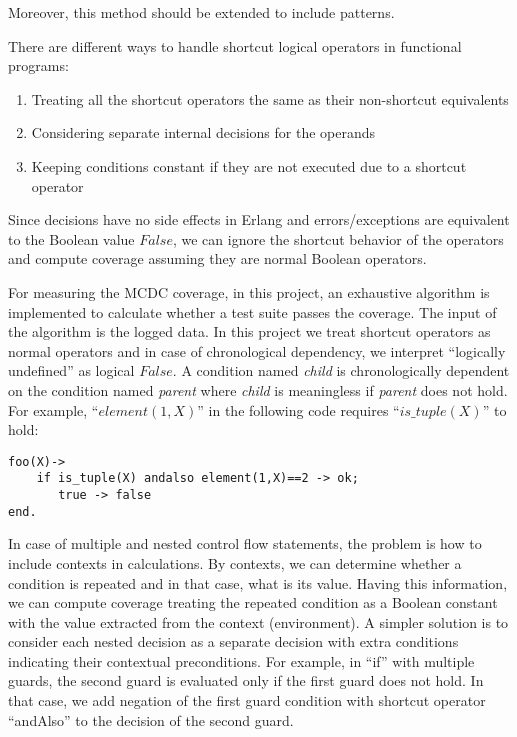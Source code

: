 \documentclass[12pt,a4paper]{report}
\begin{document}
Moreover, this method should be extended to include patterns.

There are different ways to handle shortcut logical operators in functional programs:

\begin{enumerate}
 \item Treating all the shortcut operators the same as their non-shortcut equivalents
 \item Considering separate internal decisions for the operands\cite{DO-248B} 
 \item Keeping conditions constant if they are not executed due to a shortcut operator\cite{chilenski1994applicability}
\end{enumerate}
 
Since decisions have no side effects in Erlang and errors/exceptions are equivalent to the Boolean value $False$, we can ignore the shortcut behavior of the operators and compute coverage assuming they are normal Boolean operators.  
 
For measuring the MCDC coverage, in this project, an exhaustive algorithm is implemented to calculate whether a test suite passes the coverage. The input of the algorithm is the logged data. In this project we treat shortcut operators as normal operators and in case of chronological dependency, we interpret ``logically undefined'' as logical $False$. A condition named \emph{child} is chronologically dependent on the condition named \emph{parent} where \emph{child} is meaningless if \emph{parent} does not hold. For example, ``$element(1,X)$'' in the following code requires ``$is\_tuple(X)$'' to hold:

\begin{lstlisting}
foo(X)->
    if is_tuple(X) andalso element(1,X)==2 -> ok;
       true -> false
end.
\end{lstlisting} 

In case of multiple and nested control flow statements, the problem is how to include contexts in calculations. By contexts, we can determine whether a condition is repeated and in that case, what is its value. Having this information, we can compute coverage treating the repeated condition as a Boolean constant with the value extracted from the context (environment). A simpler solution is to consider each nested decision as a separate decision with extra conditions indicating their contextual preconditions. For example, in ``if'' with multiple guards, the second guard is evaluated only if the first guard does not hold. In that case, we add negation of the first guard condition with shortcut operator ``andAlso'' to the decision of the second guard.
\end{document}
